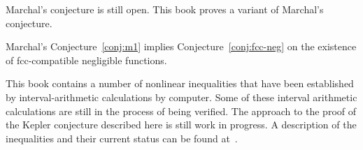 Marchal's conjecture is still open.  This book proves a variant of Marchal's conjecture.

\begin{theorem}\label{theorem:mk1}
Marchal's Conjecture~\ref{conj:m1} implies Conjecture~\ref{conj:fcc-neg} on the existence of fcc-compatible negligible functions.
\end{theorem}

\begin{note}%
This book contains a number of nonlinear inequalities that have been established by interval-arithmetic calculations by computer.   Some of these interval arithmetic calculations are still in the process of being verified.  The approach to the proof of the Kepler conjecture described here is still work in progress.  A description of the inequalities and their current status can be found at~\cite{hales:2009:nonlinear}. 
\end{note}

